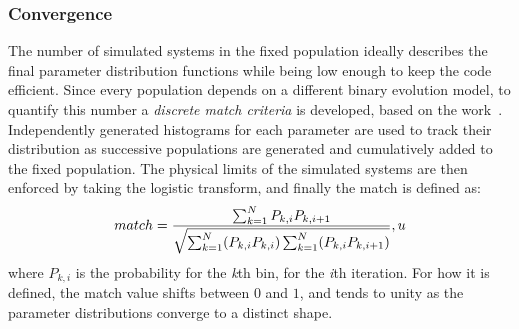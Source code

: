\subsubsection{Convergence}
The number of simulated systems in the fixed population ideally describes the final parameter distribution functions while being low enough to keep the code efficient. 
Since every population depends on a different binary evolution model, to quantify this number a \textit{discrete match criteria} is developed, based on the work~\cite{Chatziioannou17}.
Independently generated histograms for each parameter are used to track their distribution as successive populations are generated and cumulatively added to the fixed population.
The physical limits of the simulated systems are then enforced by taking the logistic transform, and finally the match is defined as: 
\begin{equation}
    match=\displaystyle\frac{\sum_{k=1}^{N}P_{k,i} P_{k,i+1}}{\sqrt{\sum_{k=1}^{N}(P_{k,i}P_{k,i})\sum_{k=1}^{N}(P_{k,i}P_{k,i+1})}},
    \label{eq: match condition}
    \notag
u\end{equation}
where $P_{k,i}$ is the probability for the \textit{k}th bin, for the \textit{i}th iteration.
For how it is defined, the match value shifts between $0$ and $1$, and tends to unity as the parameter distributions converge to a distinct shape.

